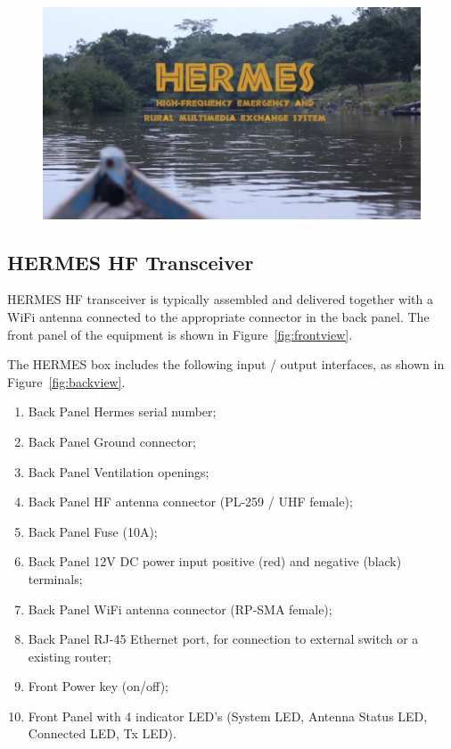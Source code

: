 \documentclass[11pt,a4paper]{article}
\begin{document}
\begin{figure}[!ht]
\includegraphics[width=1\textwidth]{pictures/hermes.png}
\end{figure}

\subsection{HERMES HF Transceiver}

HERMES HF transceiver is typically assembled and delivered together with a WiFi antenna connected to the appropriate connector in the back panel. The front panel of the equipment is shown in Figure~\ref{fig:frontview}.

The HERMES box includes the following input / output interfaces, as shown in Figure~\ref{fig:backview}.


\begin{enumerate}
    \item Back Panel Hermes serial number;
    \item Back Panel Ground connector;
    \item Back Panel Ventilation openings;
    \item Back Panel HF antenna connector (PL-259 / UHF female);
     \item Back Panel Fuse (10A);
    \item Back Panel 12V DC power input positive (red) and negative (black) terminals;
    \item Back Panel WiFi antenna connector (RP-SMA female);
    \item Back Panel RJ-45 Ethernet port, for connection to external switch or a existing router;
    \item Front Power key (on/off);
    \item Front Panel with 4 indicator LED's (System LED, Antenna Status LED, Connected LED, Tx LED).
\end{enumerate}
\end{document}
